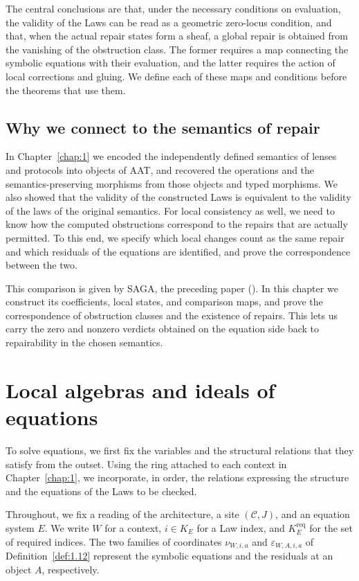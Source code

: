 The central conclusions are that, under the necessary conditions on evaluation, the
validity of the Laws can be read as a geometric zero-locus condition, and that, when the
actual repair states form a sheaf, a global repair is obtained from the vanishing of the
obstruction class. The former requires a map connecting the symbolic equations with their
evaluation, and the latter requires the action of local corrections and gluing. We define
each of these maps and conditions before the theorems that use them.

\subsection*{Why we connect to the semantics of repair}

In Chapter~\ref{chap:1} we encoded the independently defined semantics of lenses and
protocols into objects of AAT, and recovered the operations and the semantics-preserving
morphisms from those objects and typed morphisms. We also showed that the validity of the
constructed Laws is equivalent to the validity of the laws of the original semantics. For
local consistency as well, we need to know how the computed obstructions correspond to the
repairs that are actually permitted. To this end, we specify which local changes count as
the same repair and which residuals of the equations are identified, and prove the
correspondence between the two.

This comparison is given by SAGA, the preceding paper
(\cite[\href{https://arxiv.org/abs/2608.21458}{\S\S4--5}]{SAGA}).
In this chapter we construct its coefficients, local states, and comparison maps, and prove
the correspondence of obstruction classes and the existence of repairs. This lets us carry
the zero and nonzero verdicts obtained on the equation side back to repairability in the
chosen semantics.

\section{Local algebras and ideals of equations}\label{sec:2.1}

To solve equations, we first fix the variables and the structural relations that they
satisfy from the outset. Using the ring attached to each context in Chapter~\ref{chap:1},
we incorporate, in order, the relations expressing the structure and the equations of the
Laws to be checked.

Throughout, we fix a reading of the architecture, a site $(\mathcal{C},J)$, and an equation
system $E$. We write $W$ for a context, $i\in K_E$ for a Law index, and
$K_E^{\mathrm{req}}$ for the set of required indices. The two families of coordinates
$\nu_{W,i,a}$ and $\varepsilon_{W,A,i,a}$ of Definition~\ref{def:1.12} represent the
symbolic equations and the residuals at an object $A$, respectively.

